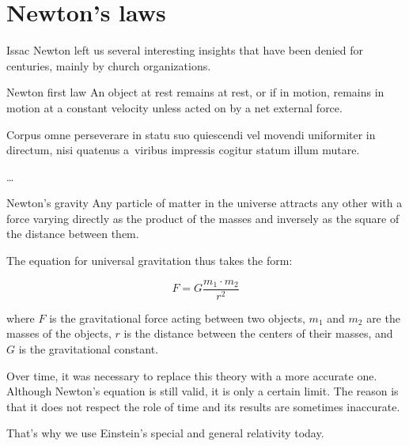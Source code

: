 \documentclass[a5paper,12pt]{book}							%
\newenvironment{remember}
{\begin{tcolorbox}[colframe=red, colback=AliceBlue]}
	{\end{tcolorbox}}
\begin{document}
	\section{Newton's laws}
	
	Issac Newton left us several interesting insights that have been denied for centuries, mainly by church organizations.
	
	\begin{define}{Newton first law}{}
		An object at rest remains at rest, or if in motion, remains in motion at a constant velocity unless acted on by a net external force.
		
		Corpus omne perseverare in statu suo quiescendi vel movendi uniformiter in directum, nisi quatenus a~viribus impressis cogitur statum illum mutare.
	\end{define}
	
	\dots
	
	\begin{define}{Newton's gravity}{}
		Any particle of matter in the universe attracts any other with a force varying directly as the product of the masses and inversely as the square of the distance between them.
	\end{define}
	
	The equation for universal gravitation thus takes the form:
	
	\begin{remember}
		\[F = G\frac{m_1\cdot m_2}{r^2}\]
	\end{remember}
	
	where $F$ is the gravitational force acting between two objects, $m_1$ and $m_2$ are the masses of the objects, $r$ is the distance between the centers of their masses, and $G$ is the gravitational constant. 
	
	Over time, it was necessary to replace this theory with a more accurate one. Although Newton's equation is still valid, it is only a certain limit. The reason is that it does not respect the role of time and its results are sometimes inaccurate.
	
	That's why we use Einstein's special and general relativity today.
	
\end{document}
